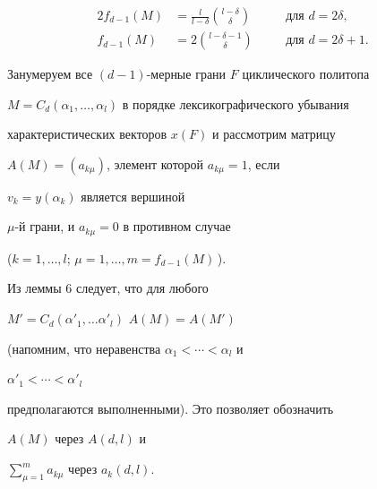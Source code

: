 \begin{alignat*}{2}


f_{d-1}(M) &=\frac{l}{l-\delta}\binom{l-\delta}{\delta}


&\quad &\text{для }d=2\delta,\\


f_{d-1}(M) &=2\binom{l-\delta-1}{\delta}&\quad


&\text{для }d=2\delta+1.


\end{alignat*}










Занумеруем все $(d-1)$-мерные грани $F$ циклического политопа


$M=C_d(\alpha_1,\dotsc,\alpha_l)$ в порядке лексикографического убывания


характеристических векторов $x(F)$ и рассмотрим матрицу


$A(M)=(a_{k\mu})$, элемент которой $a_{k\mu}=1$, если


$v_k=y(\alpha_k)$ является вершиной


$\mu$-й грани, и $a_{k\mu}=0$ в противном случае


($k=1,\dotsc,l$; $\mu=1,\dotsc,m=f_{d-1}(M)$\,).


Из леммы 6 следует, что для любого


$M'=C_d(\alpha'_1,\dotsc\alpha'_l)$\; $A(M)=A(M')$


(напомним, что неравенства $\alpha_1<\dotsb<\alpha_l$ и


$\alpha'_1<\dotsb<\alpha'_l$


предполагаются выполненными). Это позволяет обозначить


$A(M)$ через $A(d,l)$ и


$\sum\limits^m_{\mu=1}a_{k\mu}$ через $a_k(d,l)$.





